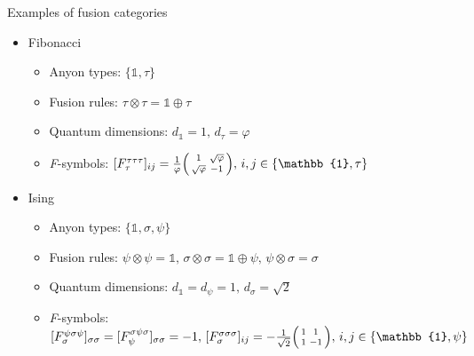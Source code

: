 \documentclass{fdubeamer}
\newcommand{\1}{\mathbb{1}}
\begin{document}
\begin{frame}{Examples of fusion categories}

\linespread{1.4}
\selectfont

\begin{itemize}
  \item Fibonacci

    \begin{itemize}
      \item Anyon types: $\{\1, \tau\}$
      \item Fusion rules: $\tau\otimes\tau=\1\oplus\tau$
      \item Quantum dimensions: $d_{\1}=1, \, d_\tau=\varphi$
      \item \textit{F}-symbols:
        $
          [F^{\tau\tau\tau}_\tau]_{ij} = \frac{1}{\varphi} \Bigl(\begin{smallmatrix} 1 & \sqrt\varphi \\ \sqrt\varphi & -1 \end{smallmatrix}\Bigr), \,
          i,j \in \{\1, \tau\}
        $
    \end{itemize}

  \item Ising

    \begin{itemize}
      \item Anyon types: $\{\1, \sigma, \psi\}$
      \item Fusion rules: $\psi\otimes\psi=\1, \, \sigma\otimes\sigma=\1\oplus\psi, \, \psi\otimes\sigma=\sigma$
      \item Quantum dimensions: $d_{\1}=d_\psi=1, \, d_\sigma=\sqrt2$
      \item \textit{F}-symbols:
        $
          [F^{\psi\sigma\psi}_\sigma]_{\sigma\sigma} = [F^{\sigma\psi\sigma}_\psi]_{\sigma\sigma} = -1, \,
          [F^{\sigma\sigma\sigma}_\sigma]_{ij} = -\frac{1}{\sqrt2} \Bigl(\begin{smallmatrix} 1 & 1 \\[0.5ex] 1 & -1 \end{smallmatrix}\Bigr), \,
          i,j \in \{\1, \psi\}
        $
    \end{itemize}
\end{itemize}

\end{frame}
\end{document}
